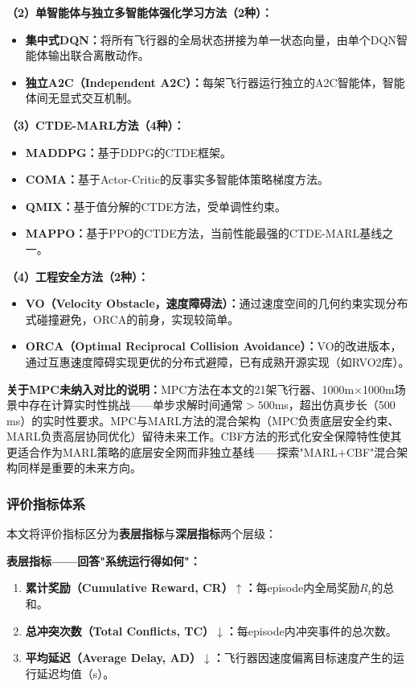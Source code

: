 \documentclass[12pt,a4paper,UTF8]{ctexart}
\begin{document}
\textbf{（2）单智能体与独立多智能体强化学习方法（2种）：}
\begin{itemize}
    \item \textbf{集中式DQN：}将所有飞行器的全局状态拼接为单一状态向量，由单个DQN智能体输出联合离散动作。
    \item \textbf{独立A2C（Independent A2C）：}每架飞行器运行独立的A2C智能体，智能体间无显式交互机制。
\end{itemize}

\textbf{（3）CTDE-MARL方法（4种）：}
\begin{itemize}
    \item \textbf{MADDPG：}基于DDPG的CTDE框架。
    \item \textbf{COMA：}基于Actor-Critic的反事实多智能体策略梯度方法。
    \item \textbf{QMIX：}基于值分解的CTDE方法，受单调性约束。
    \item \textbf{MAPPO：}基于PPO的CTDE方法，当前性能最强的CTDE-MARL基线之一。
\end{itemize}

\textbf{（4）工程安全方法（2种）：}
\begin{itemize}
    \item \textbf{VO（Velocity Obstacle，速度障碍法）：}通过速度空间的几何约束实现分布式碰撞避免，ORCA的前身，实现较简单。
    \item \textbf{ORCA（Optimal Reciprocal Collision Avoidance）：}VO的改进版本，通过互惠速度障碍实现更优的分布式避障，已有成熟开源实现（如RVO2库）。
\end{itemize}

\textbf{关于MPC未纳入对比的说明：}MPC方法在本文的21架飞行器、1000m$\times$1000m场景中存在计算实时性挑战——单步求解时间通常$>500$ms，超出仿真步长（500 ms）的实时性要求。MPC与MARL方法的混合架构（MPC负责底层安全约束、MARL负责高层协同优化）留待未来工作。CBF方法的形式化安全保障特性使其更适合作为MARL策略的底层安全网而非独立基线——探索"MARL$+$CBF"混合架构同样是重要的未来方向。

\subsubsection{评价指标体系}

本文将评价指标区分为\textbf{表层指标}与\textbf{深层指标}两个层级：

\textbf{表层指标——回答"系统运行得如何"：}
\begin{enumerate}[label=(\arabic*)]
    \item \textbf{累计奖励（Cumulative Reward, CR）$\uparrow$：}每episode内全局奖励$R_t$的总和。
    \item \textbf{总冲突次数（Total Conflicts, TC）$\downarrow$：}每episode内冲突事件的总次数。
    \item \textbf{平均延迟（Average Delay, AD）$\downarrow$：}飞行器因速度偏离目标速度产生的运行延迟均值（s）。
\end{enumerate}
\end{document}

